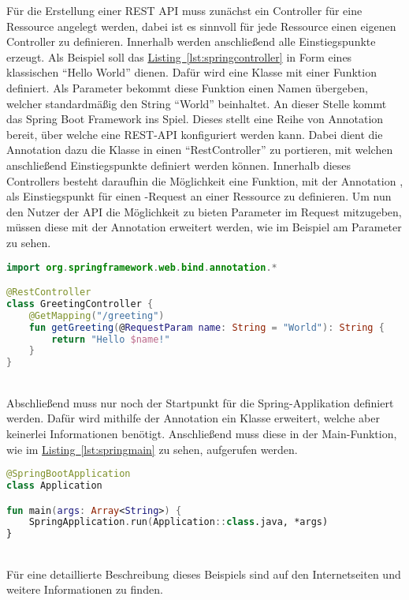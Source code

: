 Für die Erstellung einer \gls{REST} \gls{API} muss zunächst ein Controller für eine Ressource angelegt werden, dabei ist es sinnvoll für jede Ressource einen eigenen Controller zu definieren. Innerhalb werden anschließend alle Einstiegspunkte erzeugt. Als Beispiel soll das \hyperref[lst:springcontroller]{Listing~\ref{lst:springcontroller}} in Form eines klassischen \enquote{Hello World} dienen. Dafür wird eine Klasse  mit einer Funktion  definiert. Als Parameter bekommt diese Funktion einen Namen übergeben, welcher standardmäßig den String \enquote{World} beinhaltet. An dieser Stelle kommt das Spring Boot Framework ins Spiel. Dieses stellt eine Reihe von Annotation bereit, über welche eine \gls{REST}-\gls{API} konfiguriert werden kann. Dabei dient die Annotation  dazu die Klasse  in einen \enquote{RestController} zu portieren, mit welchen anschließend Einstiegspunkte definiert werden können. Innerhalb dieses Controllers besteht daraufhin die Möglichkeit eine Funktion, mit der Annotation , als Einstiegspunkt für einen -Request an einer Ressource zu definieren. Um nun den Nutzer der \gls{API} die Möglichkeit zu bieten Parameter im Request mitzugeben, müssen diese mit der Annotation  erweitert werden, wie im Beispiel am Parameter  zu sehen.\\
\begin{lstlisting}[style=lstStyleFramed, language=Kotlin, caption={Beispiel: Spring Controller}, label=lst:springcontroller, float]
import org.springframework.web.bind.annotation.*

@RestController
class GreetingController {
	@GetMapping("/greeting")
	fun getGreeting(@RequestParam name: String = "World"): String {
		return "Hello $name!"
	}
}
\end{lstlisting}
\\
Abschließend muss nur noch der Startpunkt für die Spring-Applikation definiert werden. Dafür wird mithilfe der Annotation  ein Klasse erweitert, welche aber keinerlei Informationen benötigt. Anschließend muss diese in der Main-Funktion, wie im \hyperref[lst:springmain]{Listing~\ref{lst:springmain}} zu sehen, aufgerufen werden.
\\
\begin{lstlisting}[style=lstStyleFramed, language=Kotlin, caption={Beispiel: Spring Application Class}, label=lst:springmain, float]
@SpringBootApplication
class Application

fun main(args: Array<String>) {
	SpringApplication.run(Application::class.java, *args)
}
\end{lstlisting}
\\
Für eine detaillierte Beschreibung dieses Beispiels sind auf den Internetseiten \cite{springTutorialKotlin} und \cite{springTutorial} weitere Informationen zu finden.


